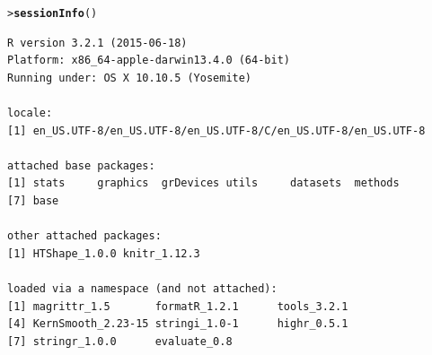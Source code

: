 \documentclass[a4paper, 10pt]{article}\usepackage[]{graphicx}\usepackage[]{color}
\makeatletter
\newcommand{\hlstd}[1]{\textcolor[rgb]{0.345,0.345,0.345}{#1}}%
\newcommand{\hlkwd}[1]{\textcolor[rgb]{0.737,0.353,0.396}{\textbf{#1}}}%
\newenvironment{kframe}{%
 \def\at@end@of@kframe{}%
 \ifinner\ifhmode%
  \def\at@end@of@kframe{\end{minipage}}%
  \begin{minipage}{\columnwidth}%
 \fi\fi%
 \def\FrameCommand##1{\hskip\@totalleftmargin \hskip-\fboxsep
 \colorbox{shadecolor}{##1}\hskip-\fboxsep
     \hskip-\linewidth \hskip-\@totalleftmargin \hskip\columnwidth}%
 \MakeFramed {\advance\hsize-\width
   \@totalleftmargin\z@ \linewidth\hsize
   \@setminipage}}%
 {\par\unskip\endMakeFramed%
 \at@end@of@kframe}
\newenvironment{knitrout}{}{} %
\makeatother
\begin{document}
\begin{knitrout}\small
{}\color{fgcolor}\begin{kframe}
\begin{alltt}
\hlstd{> }\hlkwd{sessionInfo}\hlstd{()}
\end{alltt}
\begin{verbatim}
R version 3.2.1 (2015-06-18)
Platform: x86_64-apple-darwin13.4.0 (64-bit)
Running under: OS X 10.10.5 (Yosemite)

locale:
[1] en_US.UTF-8/en_US.UTF-8/en_US.UTF-8/C/en_US.UTF-8/en_US.UTF-8

attached base packages:
[1] stats     graphics  grDevices utils     datasets  methods  
[7] base     

other attached packages:
[1] HTShape_1.0.0 knitr_1.12.3 

loaded via a namespace (and not attached):
[1] magrittr_1.5       formatR_1.2.1      tools_3.2.1       
[4] KernSmooth_2.23-15 stringi_1.0-1      highr_0.5.1       
[7] stringr_1.0.0      evaluate_0.8      
\end{verbatim}
\end{kframe}
\end{knitrout}

\newpage


\end{document}
